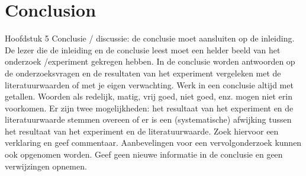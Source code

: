 \chapter{Conclusion}
Hoofdstuk 5 Conclusie / discussie: de conclusie moet aansluiten op de inleiding. De lezer die de inleiding en de conclusie leest moet een helder beeld van het onderzoek /experiment gekregen hebben. In de conclusie worden antwoorden op de onderzoeksvragen en de resultaten van het experiment vergeleken met de literatuurwaarden of met je eigen verwachting. Werk in een conclusie altijd met getallen. Woorden als redelijk, matig, vrij goed, niet goed, enz. mogen niet erin voorkomen. Er zijn twee mogelijkheden: het resultaat van het experiment en de literatuurwaarde stemmen overeen of er is een (systematische) afwijking tussen het resultaat van het experiment en de literatuurwaarde. Zoek hiervoor een verklaring en geef commentaar. Aanbevelingen voor een vervolgonderzoek kunnen ook opgenomen worden. Geef geen nieuwe informatie in de conclusie en geen verwijzingen opnemen.